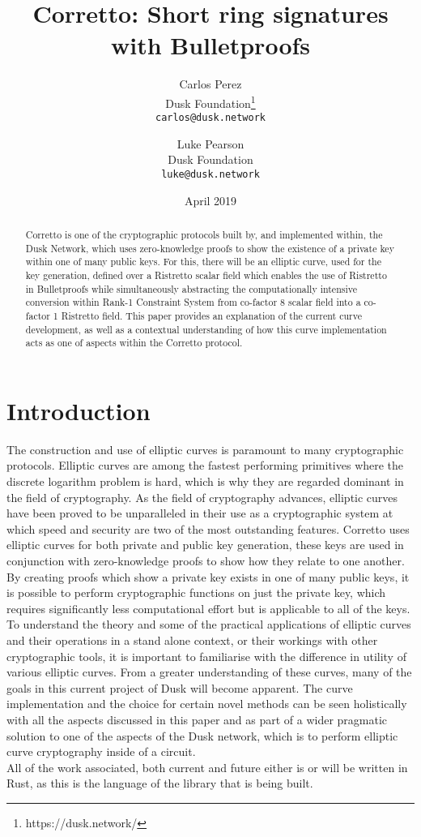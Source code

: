 \documentclass{article}
\title{Corretto: Short ring signatures with Bulletproofs}
\author{
  Carlos Perez\\
  Dusk Foundation\footnote{https://dusk.network/}\\
  \texttt{carlos@dusk.network}
  \and
  Luke Pearson\\
  Dusk Foundation\\
  \texttt{luke@dusk.network}
}
\date{April 2019}
\begin{document}
\maketitle
\thispagestyle{empty}
\pagestyle{empty}

\begin{abstract}
Corretto is one of the cryptographic protocols built by, and implemented within, the Dusk Network, which uses zero-knowledge proofs to show the existence of a private key within one of many public keys. For this, there will be an elliptic curve, used for the key generation, defined over a Ristretto scalar field which enables the use of Ristretto in Bulletproofs while simultaneously abstracting the computationally intensive conversion within Rank-1 Constraint System from co-factor 8 scalar field into a co-factor 1 Ristretto field. This paper provides an explanation of the current curve development, as well as a contextual understanding of how this curve implementation acts as one of aspects within the Corretto protocol.


\end{abstract}

\newpage

\tableofcontents

\newpage

\section{Introduction}
The construction and use of elliptic curves is paramount to many cryptographic protocols. Elliptic curves are among the fastest performing primitives where the discrete logarithm problem is hard, which is why they are regarded dominant in the field of cryptography. As the field of cryptography advances, elliptic curves have been proved to be unparalleled in their use as a cryptographic system at which speed and security are two of the most outstanding features. Corretto uses elliptic curves for both private and public key generation, these keys are used in conjunction with zero-knowledge proofs to show how they relate to one another. By creating proofs which show a private key exists in one of many public keys, it is possible to perform cryptographic functions on just the private key, which requires significantly less computational effort but is applicable to all of the keys.  To understand the theory and some of the practical applications of elliptic curves and their operations in a stand alone context, or their workings with other cryptographic tools, it is important to familiarise with the difference in utility of various elliptic curves. From a greater understanding of these curves, many of the goals in this current project of Dusk will become apparent.  The curve implementation and the choice for certain novel methods can be seen holistically with all the aspects discussed in this paper and as part of a wider pragmatic solution to one of the aspects of the Dusk network, which is to perform elliptic curve cryptography inside of a circuit. \\
All of the work associated, both current and future either is or will be written in Rust, as this is the language of the library that is being built.
\end{document}
